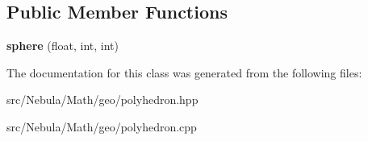 \subsection*{\-Public \-Member \-Functions}
\begin{DoxyCompactItemize}
\item 
\hypertarget{classmath_1_1geo_1_1sphere_ad30f9edddc96ef9c7a4062e79694556d}{{\bfseries sphere} (float, int, int)}\label{classmath_1_1geo_1_1sphere_ad30f9edddc96ef9c7a4062e79694556d}

\end{DoxyCompactItemize}


\-The documentation for this class was generated from the following files\-:\begin{DoxyCompactItemize}
\item 
src/\-Nebula/\-Math/geo/polyhedron.\-hpp\item 
src/\-Nebula/\-Math/geo/polyhedron.\-cpp\end{DoxyCompactItemize}
